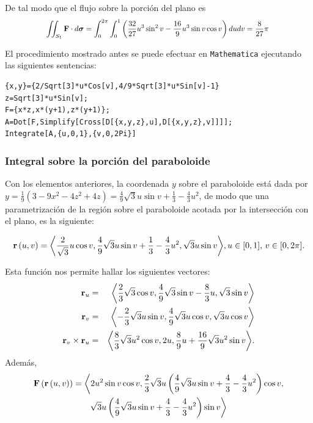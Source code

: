De tal modo que el flujo sobre la porción del plano es
\begin{equation} \label{T1}
\scalebox{0.88}{%
$\displaystyle \iint_{S_1} {\bf F} \cdot d\boldsymbol{\sigma} = \int_{0}^{2\pi }\int_{0}^{1}\left(\frac{32}{27}u^{3}\sin ^{2}v-\frac{16}{9}u^{3}\sin v\cos v \right) dudv = \frac{8}{27}\pi$
}
\end{equation}

El procedimiento mostrado antes se puede efectuar en \verb"Mathematica"
ejecutando las siguientes sentencias:

\begin{tcolorbox}[title=\bf Instrucción \verb"Mathematica"]\begin{Verbatim}[formatcom=\letraverbatim]
{x,y}={2/Sqrt[3]*u*Cos[v],4/9*Sqrt[3]*u*Sin[v]-1}
z=Sqrt[3]*u*Sin[v];
F={x*z,x*(y+1),z*(y+1)};
A=Dot[F,Simplify[Cross[D[{x,y,z},u],D[{x,y,z},v]]]];
Integrate[A,{u,0,1},{v,0,2Pi}]
\end{Verbatim}
\end{tcolorbox}

\subsubsection{Integral sobre la porción del paraboloide}

Con los elementos anteriores, la coordenada $y$ sobre el paraboloide está dada por
$y = \frac{1}{9}\left( 3-9x^{2}-4z^{2}+4z\right)= \frac{4}{9}\sqrt{3}u\sin v+\frac{1}{3}-\frac{4}{3}u^{2}$,
de modo que una parametrización de la región sobre el paraboloide acotada por la intersección con el plano, es la siguiente:

{\footnotesize
\[{\bf r}\left( u,v\right) =\left\langle \frac{2}{\sqrt{3}}u\cos v,\frac{4}{9}\sqrt{3}u\sin v+\frac{1}{3}-\frac{4}{3}u^{2},\sqrt{3}u\sin v\right\rangle\!,u\in \lbrack 0,1],\, v\in \lbrack 0,2\pi ].\]
}

Esta función nos permite hallar los siguientes vectores:
\begin{eqnarray*}
{\bf r}_{u} &=& \left\langle \frac{2}{3}\sqrt{3}\cos v,\frac{4}{9}\sqrt{3}\sin v-\frac{8}{3}u,\sqrt{3}\sin v\right\rangle \\
{\bf r}_{v} &=& \left\langle -\frac{2}{3}\sqrt{3}u\sin v,\frac{4}{9}\sqrt{3}u\cos v,\sqrt{3}u\cos v\right\rangle \\
{\bf r}_{v}\times {\bf r}_{u} %
&=&  \left\langle \frac{8}{3}\sqrt{3}u^{2}\cos v,2u,\frac{8}{9}u+\frac{16}{9}\sqrt{3}u^{2}\sin v\right\rangle\!.
\end{eqnarray*}
Además,
\begin{multline*}
{\bf F}\left( {\bf r}\left( u,v\right) \right) = \bigg\langle 2u^{2}\sin v\cos v,
\frac{2}{3}\sqrt{3}u\left( \frac{4}{9}\sqrt{3}u\sin v+\frac{4}{3}- \frac{4}{3}u^{2}\right) \cos v, \\
\sqrt{3}u\left( \frac{4}{9}\sqrt{3}u\sin v+\frac{4}{3}-\frac{4}{3}u^{2}\right) \sin v\bigg\rangle
\end{multline*}

